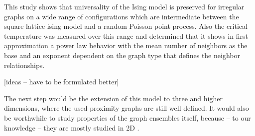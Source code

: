 \label{sec:conclusion}
This study shows that universality of the Ising model is preserved for
irregular graphs on a wide range of configurations which are intermediate
between the square lattice ising model and a random Poisson point process.
Also the critical temperature was measured over this range and determined
that it shows in first approximation a power law behavior with the mean
number of neighbors as the base and an exponent dependent on the
graph type that defines the neighbor relationships.

[ideas -- have to be formulated better]

The next step would be the extension of this model to three and higher
dimensions, where the used proximity graphs are still well defined. It
would also be worthwhile to study properties of the graph ensembles itself,
because -- to our knowledge -- they are mostly studied in 2D \cite{RNGCell}.
